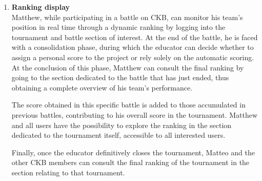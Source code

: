 \begin{enumerate}[label=\textbf{\Alph*}.]
\item \textbf{Ranking display} \\
Matthew, while participating in a battle on CKB, can monitor his team's position in real time through a dynamic ranking by logging into the tournament and battle section of interest. At the end of the battle, he is faced with a consolidation phase, during which the educator can decide whether to assign a personal score to the project or rely solely on the automatic scoring. At the conclusion of this phase, Matthew can consult the final ranking by going to the section dedicated to the battle that has just ended, thus obtaining a complete overview of his team's performance.

The score obtained in this specific battle is added to those accumulated in previous battles, contributing to his overall score in the tournament. Matthew and all users have the possibility to explore the ranking in the section dedicated to the tournament itself, accessible to all interested users.

Finally, once the educator definitively closes the tournament, Matteo and the other CKB members can consult the final ranking of the tournament in the section relating to that tournament.


\end{enumerate}
